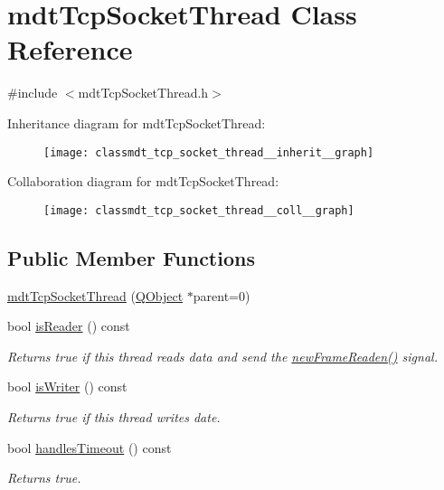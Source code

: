 \hypertarget{classmdt_tcp_socket_thread}{\section{mdt\-Tcp\-Socket\-Thread Class Reference}
\label{classmdt_tcp_socket_thread}
}


{\ttfamily \#include $<$mdt\-Tcp\-Socket\-Thread.\-h$>$}



Inheritance diagram for mdt\-Tcp\-Socket\-Thread\-:\nopagebreak
\begin{figure}[H]
\begin{center}
\leavevmode
\texttt{[image: classmdt\_tcp\_socket\_thread\_\_inherit\_\_graph]}
\end{center}
\end{figure}


Collaboration diagram for mdt\-Tcp\-Socket\-Thread\-:\nopagebreak
\begin{figure}[H]
\begin{center}
\leavevmode
\texttt{[image: classmdt\_tcp\_socket\_thread\_\_coll\_\_graph]}
\end{center}
\end{figure}
\subsection*{Public Member Functions}
\begin{DoxyCompactItemize}
\item 
\hyperlink{classmdt_tcp_socket_thread_ab379d78b2d32a9361dbe46a009c687d4}{mdt\-Tcp\-Socket\-Thread} (\hyperlink{class_q_object}{Q\-Object} $\ast$parent=0)
\item 
bool \hyperlink{classmdt_tcp_socket_thread_a3224f12c8ff8d695975030f3f6215010}{is\-Reader} () const 
\begin{DoxyCompactList}\small\item\em Returns true if this thread reads data and send the \hyperlink{classmdt_port_thread_a7fc2245c753fd65e1beffec211c41461}{new\-Frame\-Readen()} signal. \end{DoxyCompactList}\item 
bool \hyperlink{classmdt_tcp_socket_thread_a014ad2b3a5fbe7031eeb1d42d8f0767d}{is\-Writer} () const 
\begin{DoxyCompactList}\small\item\em Returns true if this thread writes date. \end{DoxyCompactList}\item 
bool \hyperlink{classmdt_tcp_socket_thread_aa14c9838dfb8d2defac449b8b58bbc7c}{handles\-Timeout} () const 
\begin{DoxyCompactList}\small\item\em Returns true. \end{DoxyCompactList}\end{DoxyCompactItemize}
